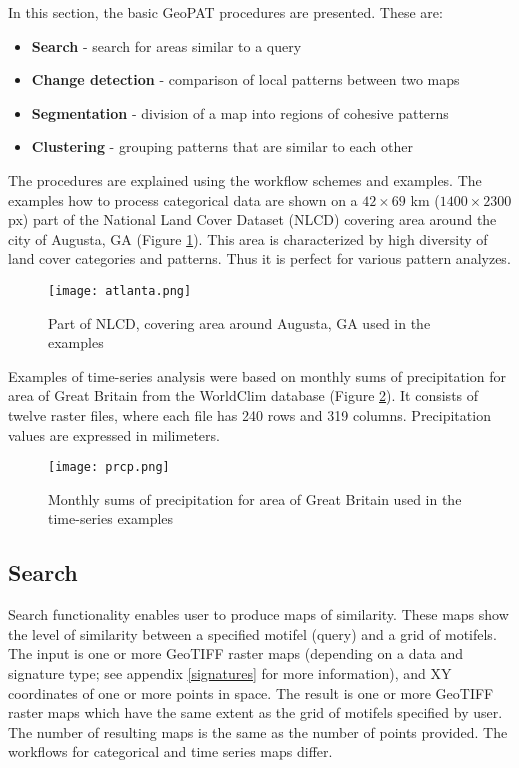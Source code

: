 In this section, the basic GeoPAT procedures are presented. These are: 

\begin{itemize}
	\item {\bf Search} - search for areas similar to a query
	\item {\bf Change detection} - comparison of local patterns between two maps
	\item {\bf Segmentation} - division of a map into regions of cohesive patterns
	\item {\bf Clustering} - grouping patterns that are similar to each other
\end{itemize}

The procedures are explained using the workflow schemes and examples.
The examples how to process categorical data are shown on a $42\times 69$ km ($1400\times 2300$ px) part of the National Land Cover Dataset (NLCD) covering area around the city of Augusta, GA (Figure \ref{FIG:AUGUSTA}).
This area is characterized by high diversity of land cover categories and patterns.
Thus it is perfect for various pattern analyzes.

\begin{figure}[H]
	\centering
	\texttt{[image: atlanta.png]}
	\caption{Part of NLCD, covering area around Augusta, GA used in the examples}
	\label{FIG:AUGUSTA}
\end{figure}

Examples of time-series analysis were based on monthly sums of precipitation for area of Great Britain from the WorldClim database (Figure \ref{FIG:PRCP}).
It consists of twelve raster files, where each file has 240 rows and 319 columns.
Precipitation values are expressed in milimeters.

\begin{figure}[H]
	\centering
	\texttt{[image: prcp.png]}
	\caption{Monthly sums of precipitation for area of Great Britain used in the time-series examples}
	\label{FIG:PRCP}
\end{figure}

\FloatBarrier

\subsection{Search}

Search functionality enables user to produce maps of similarity. 
These maps show the level of similarity between a specified motifel (query) and a grid of motifels.
The input is one or more GeoTIFF raster maps (depending on a data and signature type; see appendix \ref{signatures} for more information), and XY coordinates of one or more points in space.
The result is one or more GeoTIFF raster maps which have the same extent as the grid of motifels specified by user.
The number of resulting maps is the same as the number of points provided.
The workflows for categorical and time series maps differ.

